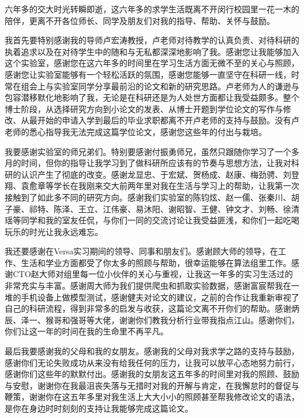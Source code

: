 

\begin{acknowledgements}
  六年多的交大时光转瞬即逝，这六年多的求学生活既离不开闵行校园里一花一木的陪伴，更离不开各位师长、同学及朋友们对我的指导、帮助、关怀与鼓励。

  我首先要特别感谢我的导师卢宏涛教授，卢老师对待教学的认真负责、对待科研的执着追求以及在对待学生中的随和与无私都深深地影响了我。感谢您让我能够加入这个实验室，感谢您在这六年多的时间里在学习生活方面无微不至的关心与照顾，感谢您让实验室能够有一个轻松活跃的氛围，感谢您能够一直坚守在科研一线，时常在组会上与实验室同学分享最前沿的论文和新的研究思路。卢老师为人的谦逊与包容潜移默化地影响了我，无论是在科研还是为人处世方面都让我受益颇多。整个博士阶段，从选择研究方向到小论文的发表、从博士开题到学位论文的写作与修改、从最开始的申请入学到最后的毕业求职都离不开卢老师的支持与鼓励。没有卢老师的悉心指导我无法完成这篇学位论文，感谢您这些年的付出与栽培。

  我要感谢实验室的师兄弟们。特别要感谢付振勇师兄，虽然只跟随你学习了一个多月的时间，但你的指导让我学习到了做科研所应该有的节奏与思想方法，让我对科研的认识产生了彻底的改变。感谢龙显忠、于宏斌、贺杨成、赵康、梅劲骋、刘登翔、袁愈章等学长在我刚来交大前两年里对我在生活与学习上的帮助，让我第一次接触到了如此多不同的研究方向。感谢我们实验室的陈钧炫、赵一儒、张秦川、胡子豪、祁特、陈泽、王立、江伟豪、易沐阳、谢昭智、王健、钟文才、刘畅、徐清瑶等同学和我的室友任侃，与你们一同的交流讨论让我受益匪浅，和你们一起吃喝玩乐的时光让我永远难忘。

  我还要感谢在Versa实习期间的领导、同事和朋友们。感谢顾大师的领导，在工作、生活和学业方面都受了你太多的照顾与帮助，很幸运能够在算法组里工作。感谢CTO赵大师对组里每一位小伙伴的关心与重视，让我这一年多的实习生活过的非常充实与丰富。感谢周大师为我们提供爬虫和抓取实验数据，感谢富宸帮我在一堆的手机设备上做模型测试，感谢健夫对论文的建议，之前的合作让我重新审视了自己的科研流程，得到非常多的启发与收获，这篇论文离不开你们的帮助。感谢炳辰、泽一、猴哥和强哥等大佬，谢谢你们教我分析行业带我指点江山。感谢你们，你们让这一年的时间在我的生命里不再平凡。

  最后我要感谢我的父母和我的女朋友。感谢我的父母对我求学之路的支持与鼓励，感谢你们无论失败成功从来没有给我任何的压力，让我可以放平心态地努力前行，感谢你们这些年的默默付出。感谢我的女朋友这五年多的时间里对我的照顾、鼓励与安慰，谢谢你在我最沮丧失落与无措时对我的开解与肯定，在我懈怠时的督促与鞭策，谢谢你在这五年多里对我生活上大大小小的照顾甚至帮我修改论文的语法，是你在身边时时刻刻的支持让我能够完成这篇论文。
\end{acknowledgements}

